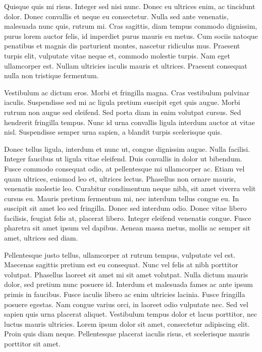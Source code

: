 \documentclass[2pt,a4paper,twoside ]{article}
\begin{document}
\begin{multicols}{2}
Quisque quis mi risus. Integer sed nisi nunc. Donec eu ultrices enim, ac tincidunt dolor. Donec convallis et neque eu consectetur. Nulla sed ante venenatis, malesuada nunc quis, rutrum mi. Cras sagittis, diam tempus commodo dignissim, purus lorem auctor felis, id imperdiet purus mauris eu metus. Cum sociis natoque penatibus et magnis dis parturient montes, nascetur ridiculus mus. Praesent turpis elit, vulputate vitae neque et, commodo molestie turpis. Nam eget ullamcorper est. Nullam ultricies iaculis mauris et ultrices. Praesent consequat nulla non tristique fermentum.

Vestibulum ac dictum eros. Morbi et fringilla magna. Cras vestibulum pulvinar iaculis. Suspendisse sed mi ac ligula pretium suscipit eget quis augue. Morbi rutrum non augue sed eleifend. Sed porta diam in enim volutpat cursus. Sed hendrerit fringilla tempus. Nunc id urna convallis ligula interdum auctor at vitae nisl. Suspendisse semper urna sapien, a blandit turpis scelerisque quis.

Donec tellus ligula, interdum et nunc ut, congue dignissim augue. Nulla facilisi. Integer faucibus ut ligula vitae eleifend. Duis convallis in dolor ut bibendum. Fusce commodo consequat odio, at pellentesque mi ullamcorper ac. Etiam vel quam ultrices, euismod leo et, ultrices lectus. Phasellus non ornare mauris, venenatis molestie leo. Curabitur condimentum neque nibh, sit amet viverra velit cursus eu. Mauris pretium fermentum mi, nec interdum tellus congue eu. In suscipit sit amet leo sed fringilla. Donec sed interdum odio. Donec vitae libero facilisis, feugiat felis at, placerat libero. Integer eleifend venenatis congue. Fusce pharetra sit amet ipsum vel dapibus. Aenean massa metus, mollis ac semper sit amet, ultrices sed diam.

Pellentesque justo tellus, ullamcorper at rutrum tempus, vulputate vel est. Maecenas sagittis pretium est eu consequat. Nunc vel felis at nibh porttitor volutpat. Phasellus laoreet sit amet mi sit amet volutpat. Nulla dictum mauris dolor, sed pretium nunc posuere id. Interdum et malesuada fames ac ante ipsum primis in faucibus. Fusce iaculis libero ac enim ultricies lacinia. Fusce fringilla posuere egestas. Nam congue varius orci, in laoreet odio vulputate nec. Sed vel sapien quis urna placerat aliquet. Vestibulum tempus dolor et lacus porttitor, nec luctus mauris ultricies. Lorem ipsum dolor sit amet, consectetur adipiscing elit. Proin quis diam neque. Pellentesque placerat iaculis risus, et scelerisque mauris porttitor sit amet.


\end{multicols}
\end{document}
